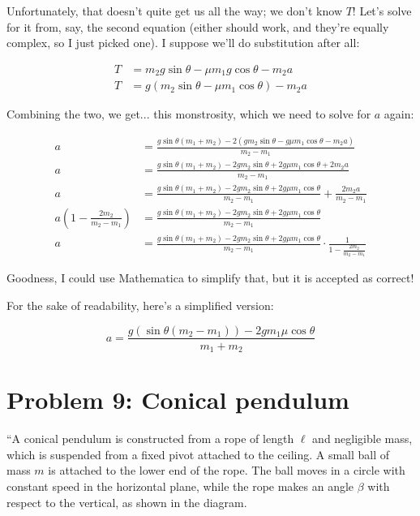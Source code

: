 \documentclass[12pt,a4paper]{report}
\begin{document}
Unfortunately, that doesn't quite get us all the way; we don't know $T$! Let's solve for it from, say, the second equation (either should work, and they're equally complex, so I just picked one). I suppose we'll do substitution after all:

\begin{align}
T &= m_2 g \sin \theta - \mu m_1 g \cos \theta - m_2 a\\
T &= g(m_2 \sin \theta - \mu m_1 \cos \theta) - m_2 a
\end{align}

Combining the two, we get... this monstrosity, which we need to solve for $a$ again:

\begin{align}
a &= \frac{g \sin \theta(m_1 + m_2) - 2(g m_2 \sin \theta - g \mu m_1 \cos \theta - m_2 a)}{m_2 - m_1}\\
a &= \frac{g \sin \theta(m_1 + m_2) - 2g m_2 \sin \theta + 2 g \mu m_1 \cos \theta + 2 m_2 a}{m_2 - m_1}\\
a &= \frac{g \sin \theta(m_1 + m_2) - 2g m_2 \sin \theta + 2 g \mu m_1 \cos \theta}{m_2 - m_1} + \frac{2 m_2 a}{m_2 - m_1}\\
a\left(1 - \frac{2 m_2}{m_2 - m_1}\right) &= \frac{g \sin \theta(m_1 + m_2) - 2g m_2 \sin \theta + 2 g \mu m_1 \cos \theta}{m_2 - m_1}\\
a &= \frac{g \sin \theta(m_1 + m_2) - 2g m_2 \sin \theta + 2 g \mu m_1 \cos \theta}{m_2 - m_1} \cdot \frac{1}{1 - \frac{2 m_2}{m_2 - m_1}}
\end{align}

Goodness, I could use Mathematica to simplify that, but it is accepted as correct!

For the sake of readability, here's a simplified version:

\begin{equation}
a = \frac{g(\sin \theta(m_2 - m_1)) - 2 g m_1 \mu \cos\theta}{m_1 + m_2}
\end{equation}

\section{Problem 9: Conical pendulum}

``A conical pendulum is constructed from a rope of length $\ell$ and negligible mass, which is suspended from a fixed pivot attached to the ceiling. A small ball of mass $m$ is attached to the lower end of the rope. The ball moves in a circle with constant speed in the horizontal plane, while the rope makes an angle $\beta$ with respect to the vertical, as shown in the diagram.
\end{document}
